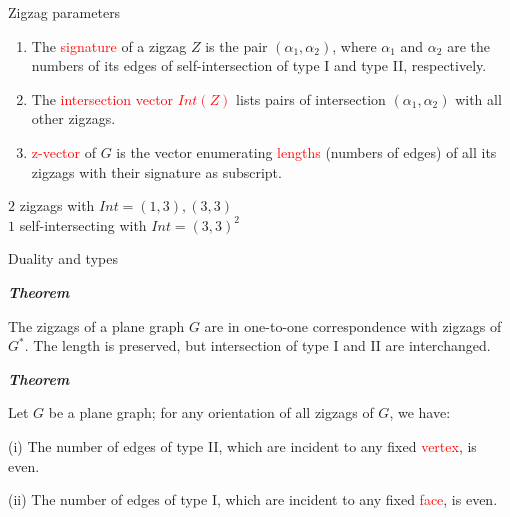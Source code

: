 \documentclass[%
pdf,
colorBG,
slideColor,
]{prosper}
\begin{document}
\begin{slide}{Zigzag parameters}

\begin{enumerate}
\item[\ding{108}] The \textcolor{red}{signature} of a zigzag $Z$ is
the pair $(\alpha_1,\alpha_2)$, where $\alpha_1$ and $\alpha_2$ are the
numbers of its edges of self-intersection of type I and type II, respectively.

\vspace{1mm}

\item[\ding{108}] The \textcolor{red}{intersection vector $Int(Z)$} lists
pairs of intersection $(\alpha_1, \alpha_2)$ with all other zigzags.

\vspace{1mm}

\item[\ding{108}] \textcolor{red}{z-vector} of $G$ is the
vector enumerating \textcolor{red}{lengths} (numbers of edges) of all its
zigzags with their signature as subscript.



\end{enumerate}

\begin{center}
\begin{minipage}{3cm}
\epsfxsize=25mm
\end{minipage}
\begin{minipage}{7cm}
$2$ zigzags with $Int=(1,3), (3,3)$\\
$1$ self-intersecting with $Int=(3,3)^{2}$
\end{minipage}
\end{center}

\end{slide}







\begin{slide}{Duality and types}

{\em {\bf Theorem}

The zigzags of a plane graph $G$ are in one-to-one correspondence with zigzags of $G^*$.
The length is preserved, but intersection of type I and II are interchanged.

}

\vspace{2mm}

{\em {\bf Theorem}

Let $G$ be a plane graph; for any orientation of all zigzags of $G$, we have:

(i) The number of edges of type II, which are incident to any fixed \textcolor{red}{vertex}, is even.

(ii) The number of edges of type I, which are incident to any fixed \textcolor{red}{face}, is even.
}


\end{slide}
\end{document}
